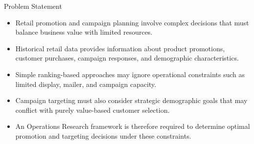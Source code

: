 \documentclass[aspectratio=169,10pt]{beamer}
\begin{document}
\begin{frame}{Problem Statement}

\vspace{0.35cm}

\begin{itemize}

    \item Retail promotion and campaign planning involve complex
    decisions that must balance business value with limited resources.

    \vspace{0.3cm}

    \item Historical retail data provides information about
    product promotions, customer purchases, campaign responses,
    and demographic characteristics.

    \vspace{0.3cm}

    \item Simple ranking-based approaches may ignore operational
    constraints such as limited display, mailer, and campaign capacity.

    \vspace{0.3cm}

    \item Campaign targeting must also consider strategic demographic
    goals that may conflict with purely value-based customer selection.

    \vspace{0.3cm}

    \item An Operations Research framework is therefore required to
    determine optimal promotion and targeting decisions under these constraints.

\end{itemize}

\end{frame}
\end{document}
